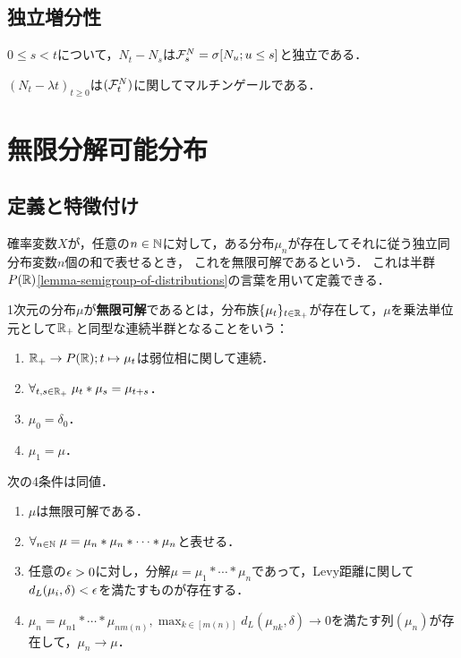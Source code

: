 \documentclass[uplatex,dvipdfmx]{jsreport}
\begin{document}
\subsection{独立増分性}

\begin{proposition}
    $0\le s<t$について，$N_t-N_s$は$\mathcal{F}^N_s=\sigma[N_u;u\le s]$と独立である．
\end{proposition}

\begin{corollary}
    $(N_t-\lambda t)_{t\ge0}$は$(\mathcal{F}_t^N)$に関してマルチンゲールである．
\end{corollary}

\section{無限分解可能分布}

\subsection{定義と特徴付け}

\begin{tcolorbox}[colframe=ForestGreen, colback=ForestGreen!10!white,breakable,colbacktitle=ForestGreen!40!white,coltitle=black,fonttitle=\bfseries\sffamily,
title=]
    確率変数$X$が，任意の$n\in\mathbb{N}$に対して，ある分布$\mu_n$が存在してそれに従う独立同分布変数$n$個の和で表せるとき，
    これを無限可解であるという．
    これは半群$P(\mathbb{R})$\ref{lemma-semigroup-of-distributions}の言葉を用いて定義できる．
\end{tcolorbox}

\begin{definition}
    1次元の分布$\mu$が\textbf{無限可解}であるとは，分布族$\{\mu_t\}_{t\in\mathbb{R}_+}$が存在して，$\mu$を乗法単位元として$\mathbb{R}_+$と同型な連続半群となることをいう：
    \begin{enumerate}
        \item $\mathbb{R}_+\to P(\mathbb{R});t\mapsto\mu_t$は弱位相に関して連続．
        \item $\forall_{t,s\in\mathbb{R}_+}\;\mu_t*\mu_s=\mu_{t+s}$．
        \item $\mu_0=\delta_0$．
        \item $\mu_1=\mu$．
    \end{enumerate}
\end{definition}

\begin{lemma}
    次の4条件は同値．
    \begin{enumerate}
        \item $\mu$は無限可解である．
        \item $\forall_{n\in\mathbb{N}}\;\mu=\mu_n*\mu_n*\cdots *\mu_n$と表せる．
        \item 任意の$\epsilon>0$に対し，分解$\mu=\mu_1*\cdots*\mu_n$であって，Levy距離に関して$d_L(\mu_i,\delta)<\epsilon$を満たすものが存在する．
        \item $\mu_n=\mu_{n1}*\cdots*\mu_{nm(n)},\max_{k\in[m(n)]}d_L(\mu_{nk},\delta)\to0$を満たす列$(\mu_n)$が存在して，$\mu_n\to\mu$．
    \end{enumerate}
\end{lemma}
\end{document}

